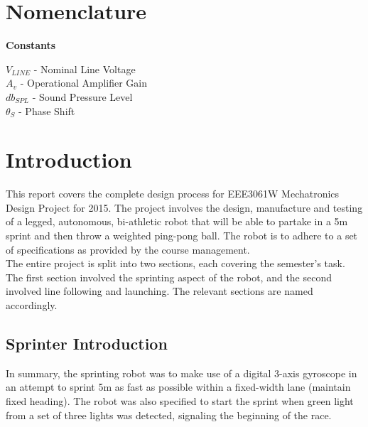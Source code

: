 
\section{Nomenclature}
\label{sec:Nomenclature}

\textbf{Constants}

\(V_{LINE}\) - Nominal Line Voltage\\
\(A_v\) - Operational Amplifier Gain\\
\(db_{SPL}\) - Sound Pressure Level\\
\(\theta_S\) - Phase Shift

\mainmatter
\section{Introduction}
\label{sec:Introduction}
  This report covers the complete design process for EEE3061W Mechatronics Design Project for 2015.  The project involves the design, manufacture and testing of a legged, autonomous, bi-athletic robot that will be able to partake in a 5m sprint and then throw a weighted ping-pong ball.  The robot is to adhere to a set of specifications as provided by the course management. \\

  The entire project is split into two sections, each covering the semester's task.  The first section involved the sprinting aspect of the robot, and the second involved line following and launching.  The relevant sections are named accordingly.

  \subsection{Sprinter Introduction}
  \label{sub:Sprinter Introduction}
    In summary, the sprinting robot was to make use of a digital 3-axis gyroscope in an attempt to sprint 5m as fast as possible within a fixed-width lane (maintain fixed heading).  The robot was also specified to start the sprint when green light from a set of three lights was detected, signaling the beginning of the race. \\

